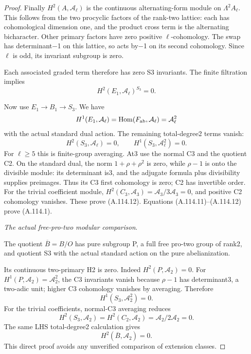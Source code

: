\begin{proof}
Finally \(H^2(A,\mathcal A_\ell)\) is the continuous alternating-form module on \(\Lambda^2 A_\ell\). This follows from the two procyclic factors of the rank-two lattice: each has cohomological dimension one, and the product cross term is the alternating bicharacter. Other primary factors have zero positive \(\ell\)-cohomology. The swap has determinant\(-\)1 on this lattice, so acts by\(-\)1 on its second cohomology. Since \(\ell\) is odd, its invariant subgroup is zero.

Each associated graded term therefore has zero S3 invariants. The finite filtration implies
\[
H^2(E_1,\mathcal A_\ell)^{S_3}=0.                             \tag{A.114.11}
\]

Now use \(E_1\to B_1\to S_3\). We have
\[
H^1(E_1,\mathcal A_\ell)=
\operatorname{Hom}(F_{\rm ab},\mathcal A_\ell)
=\mathcal A_\ell^2
\]
with the actual standard dual action. The remaining total-degree2 terms vanish:
\[
H^2(S_3,\mathcal A_\ell)=0,\qquad
H^1(S_3,\mathcal A_\ell^2)=0.                                 \tag{A.114.12}
\]
For \(\ell\ge5\) this is finite-group averaging. At3 use the normal C3 and the quotient C2. On the standard dual, the norm \(1+\rho+\rho^2\) is zero, while \(\rho-1\) is onto the divisible module: its determinant is3, and the adjugate formula plus divisibility supplies preimages. Thus its C3 first cohomology is zero; C2 has invertible order. For the trivial coefficient module, \(H^2(C_3,\mathcal A_3)=\mathcal A_3/3\mathcal A_3=0\), and positive C2 cohomology vanishes. These prove (A.114.12). Equations (A.114.11)--(A.114.12) prove (A.114.1).

\medskip\noindent\emph{The actual free-pro-two modular comparison}.

The quotient \(\overline B=B/O\) has pure subgroup P, a full free pro-two group of rank2, and quotient S3 with the actual standard action on the pure abelianization.

Its continuous two-primary H2 is zero. Indeed \(H^2(P,\mathcal A_2)=0\). For \(H^1(P,\mathcal A_2)=\mathcal A_2^2\), the C3 invariants vanish because \(\rho-1\) has determinant3, a two-adic unit; higher C3 cohomology vanishes by averaging. Therefore
\[
H^1(S_3,\mathcal A_2^2)=0.
\]
For the trivial coefficients, normal-C3 averaging reduces
\[
H^2(S_3,\mathcal A_2)=H^2(C_2,\mathcal A_2)
=\mathcal A_2/2\mathcal A_2=0.
\]
The same LHS total-degree2 calculation gives
\[
H^2(\overline B,\mathcal A_2)=0.                              \tag{A.114.13}
\]
This direct proof avoids any unverified comparison of extension classes.


\end{proof}
